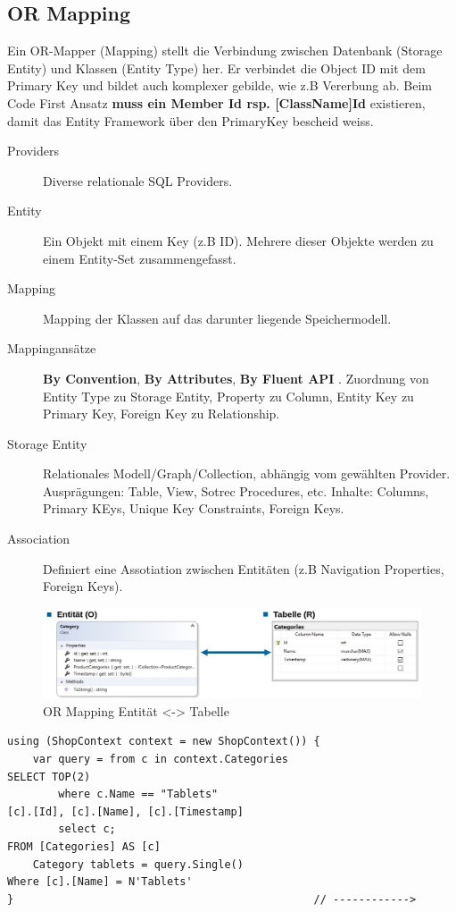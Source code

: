 \documentclass[
a4paper,
oneside,
10pt,
fleqn,
headsepline,
toc=listofnumbered, 
bibliography=totocnumbered]{scrartcl}
\begin{document}
\subsection{OR Mapping}
Ein OR-Mapper (Mapping) stellt die Verbindung zwischen Datenbank (Storage Entity) und Klassen (Entity Type) her. Er verbindet die Object ID mit dem Primary Key und bildet auch komplexer gebilde, wie z.B Vererbung ab. Beim Code First Ansatz \textbf{muss ein Member Id rsp. [ClassName]Id} existieren, damit das Entity Framework über den PrimaryKey bescheid weiss.
\begin{description}
    \item[Providers] Diverse relationale SQL Providers.
	\item[Entity] Ein Objekt mit einem Key (z.B ID). Mehrere dieser Objekte werden zu einem Entity-Set zusammengefasst.
	\item[Mapping] Mapping der Klassen auf das darunter liegende Speichermodell.
	\item[Mappingansätze] \textbf{By Convention}, \textbf{By Attributes}, \textbf{By Fluent API} . Zuordnung von Entity Type zu Storage Entity, Property zu Column, Entity Key zu Primary Key, Foreign Key zu Relationship.
	\item[Storage Entity] Relationales Modell/Graph/Collection, abhängig vom gewählten Provider. Ausprägungen: Table, View, Sotrec Procedures, etc. Inhalte: Columns, Primary KEys, Unique Key Constraints, Foreign Keys.
	\item[Association] Definiert eine Assotiation zwischen Entitäten (z.B Navigation Properties, Foreign Keys).
\end{description}

\begin{figure}[h]
	\centering
	\includegraphics[width=0.8\linewidth]{MsTe/images/entityframework_or_mapping.png}
	\caption{OR Mapping Entität <-> Tabelle}
	\label{fig:entityframeworkormapping}
\end{figure}
\begin{lstlisting}
using (ShopContext context = new ShopContext()) {
    var query = from c in context.Categories                            SELECT TOP(2)
        where c.Name == "Tablets"                                           [c].[Id], [c].[Name], [c].[Timestamp]
        select c;                                                       FROM [Categories] AS [c]
    Category tablets = query.Single()                                   Where [c].[Name] = N'Tablets'
}                                               // ------------>
\end{lstlisting}
\end{document}
